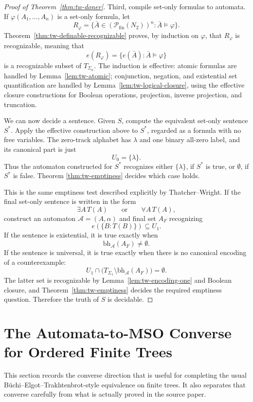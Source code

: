 \documentclass[11pt]{article}
\theoremstyle{definition}
\newcommand{\TW}{Thatcher--Wright}
\newcommand{\powfin}{\mathcal P_{\mathrm{fin}}}
\newcommand{\Term}[1]{T_{#1}}
\newcommand{\Aut}{\mathcal A}
\newcommand{\bh}{\mathrm{bh}}
\begin{document}
\begin{proof}[Proof of Theorem~\ref{thm:tw-doner}]
Third, compile set-only formulas to automata.  If
\(\varphi(A_1,\ldots,A_n)\) is a set-only formula, let
\[
  R_\varphi
  =
  \{\bar A\in(\powfin(N_2))^n:\bar A\models\varphi\}.
\]
Theorem~\ref{thm:tw-definable-recognizable} proves, by induction on
\(\varphi\), that \(R_\varphi\) is recognizable, meaning that
\[
  e(R_\varphi)=\{e(\bar A):\bar A\models\varphi\}
\]
is a recognizable subset of \(\Term{\Sigma_n}\).  The induction is effective:
atomic formulas are handled by Lemma~\ref{lem:tw-atomic}; conjunction,
negation, and existential set quantification are handled by
Lemma~\ref{lem:tw-logical-closure}, using the effective closure constructions
for Boolean operations, projection, inverse projection, and truncation.

We can now decide a sentence.  Given \(S\), compute the equivalent set-only
sentence \(S^*\).  Apply the effective construction above to \(S^*\), regarded
as a formula with no free variables.  The zero-track alphabet has \(\lambda\)
and one binary all-zero label, and its canonical part is just
\[
  U_0=\{\lambda\}.
\]
Thus the automaton constructed for \(S^*\) recognizes either \(\{\lambda\}\), if
\(S^*\) is true, or \(\emptyset\), if \(S^*\) is false.  Theorem
\ref{thm:tw-emptiness} decides which case holds.

This is the same emptiness test described explicitly by \TW{}.  If the final
set-only sentence is written in the form
\[
  \exists A\,T(A)
  \qquad\text{or}\qquad
  \forall A\,T(A),
\]
construct an automaton \(\Aut=(A,\alpha)\) and final set \(A_F\) recognizing
\[
  e(\{B:T(B)\})\subseteq U_1.
\]
If the sentence is existential, it is true exactly when
\[
  \bh_\Aut(A_F)\ne\emptyset.
\]
If the sentence is universal, it is true exactly when there is no canonical
encoding of a counterexample:
\[
  U_1\cap\bigl(\Term{\Sigma_1}\setminus\bh_\Aut(A_F)\bigr)=\emptyset.
\]
The latter set is recognizable by Lemma~\ref{lem:tw-encoding-one} and Boolean
closure, and Theorem~\ref{thm:tw-emptiness} decides the required emptiness
question.  Therefore the truth of \(S\) is decidable.
\end{proof}

\section{The Automata-to-MSO Converse for Ordered Finite Trees}
\label{sec:automata-to-mso-converse}

This section records the converse direction that is useful for completing the
usual B\"uchi--Elgot--Trakhtenbrot-style equivalence on finite trees.  It also
separates that converse carefully from what is actually proved in the source
paper.
\end{document}
